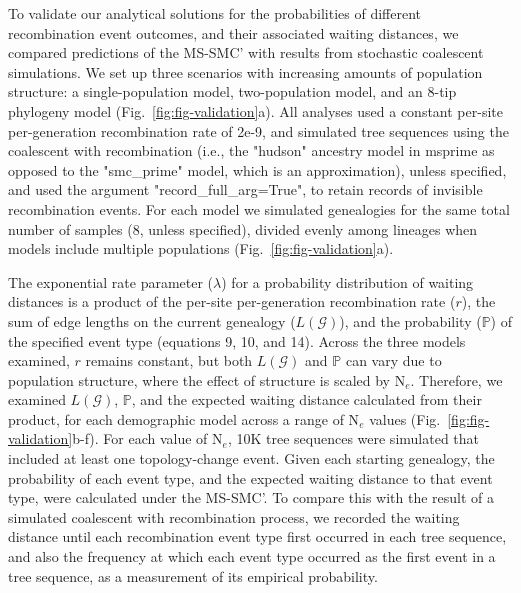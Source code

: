 \documentclass[11pt]{article}
\begin{document}
To validate our analytical solutions for the probabilities of different 
recombination event outcomes, and their associated waiting distances, 
we compared predictions of the MS-SMC' with results from stochastic 
coalescent simulations. 
We set up three scenarios with increasing amounts of population structure: 
a single-population model, two-population model, and an 8-tip phylogeny model
(Fig.~\ref{fig:fig-validation}a). 
All analyses used a constant per-site per-generation recombination rate of 
2e-9, and simulated tree sequences using the coalescent with recombination 
(i.e., the "hudson" ancestry model in msprime as opposed to the "smc\_prime" model, 
which is an approximation), unless specified, and used the argument 
"record\_full\_arg=True", to retain records of invisible recombination events. 
For each model we simulated genealogies for the same total number of samples
(8, unless specified), divided evenly among lineages when models 
include multiple populations (Fig.~\ref{fig:fig-validation}a). 

The exponential rate parameter ($\lambda$) for a probability distribution of waiting distances 
is a product of the per-site per-generation recombination rate ($r$), the sum 
of edge lengths on the current genealogy ($L(\mathcal{G})$), and the probability 
($\mathbb{P}$) of the specified event type (equations 9, 10, and 14). 
Across the three models examined, $r$ remains constant, but both $L(\mathcal{G})$ 
and $\mathbb{P}$ can vary due to population structure, where the effect of 
structure is scaled by N$_e$. 
Therefore, we examined $L(\mathcal{G})$, $\mathbb{P}$, and the expected waiting 
distance calculated from their product, for each demographic model across a range 
of N$_e$ values (Fig.~\ref{fig:fig-validation}b-f). 
For each value of N$_e$, 10K tree sequences were simulated that included at least 
one topology-change event. Given each starting genealogy,
the probability of each event type, and the expected waiting distance to that event
type, were calculated under the MS-SMC'. To compare this with the result of a 
simulated coalescent with recombination process, we recorded the waiting distance 
until each recombination event type first occurred in each tree sequence, and 
also the frequency at which each event type occurred as the first event in a 
tree sequence, as a measurement of its empirical probability.
\end{document}

